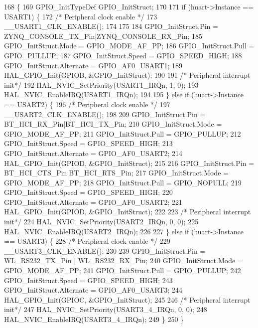 \begin{DoxyCode}
168 \{
169     GPIO\_InitTypeDef GPIO\_InitStruct;
170     
171     \textcolor{keywordflow}{if} (huart->Instance == USART1) \{
172         \textcolor{comment}{/* Peripheral clock enable */}
173         \_\_USART1\_CLK\_ENABLE();
174   
175   
184         GPIO\_InitStruct.Pin = ZYNQ\_CONSOLE\_TX\_Pin|ZYNQ\_CONSOLE\_RX\_Pin;
185         GPIO\_InitStruct.Mode = GPIO\_MODE\_AF\_PP;
186         GPIO\_InitStruct.Pull = GPIO\_PULLUP;
187         GPIO\_InitStruct.Speed = GPIO\_SPEED\_HIGH;
188         GPIO\_InitStruct.Alternate = GPIO\_AF0\_USART1;
189         HAL\_GPIO\_Init(GPIOB, &GPIO\_InitStruct);
190 
191         \textcolor{comment}{/* Peripheral interrupt init*/}
192         HAL\_NVIC\_SetPriority(USART1\_IRQn, 1, 0);
193         HAL\_NVIC\_EnableIRQ(USART1\_IRQn);
194         
195     \} \textcolor{keywordflow}{else} \textcolor{keywordflow}{if} (huart->Instance == USART2) \{
196         \textcolor{comment}{/* Peripheral clock enable */}
197         \_\_USART2\_CLK\_ENABLE();
198   
209         GPIO\_InitStruct.Pin = BT\_HCI\_RX\_Pin|BT\_HCI\_TX\_Pin;
210         GPIO\_InitStruct.Mode = GPIO\_MODE\_AF\_PP;
211         GPIO\_InitStruct.Pull = GPIO\_PULLUP;
212         GPIO\_InitStruct.Speed = GPIO\_SPEED\_HIGH;
213         GPIO\_InitStruct.Alternate = GPIO\_AF0\_USART2;
214         HAL\_GPIO\_Init(GPIOD, &GPIO\_InitStruct);
215 
216         GPIO\_InitStruct.Pin = BT\_HCI\_CTS\_Pin|BT\_HCI\_RTS\_Pin;
217         GPIO\_InitStruct.Mode = GPIO\_MODE\_AF\_PP;
218         GPIO\_InitStruct.Pull = GPIO\_NOPULL;
219         GPIO\_InitStruct.Speed = GPIO\_SPEED\_HIGH;
220         GPIO\_InitStruct.Alternate = GPIO\_AF0\_USART2;
221         HAL\_GPIO\_Init(GPIOD, &GPIO\_InitStruct);
222 
223         \textcolor{comment}{/* Peripheral interrupt init*/}
224         HAL\_NVIC\_SetPriority(USART2\_IRQn, 0, 0);
225         HAL\_NVIC\_EnableIRQ(USART2\_IRQn);
226 
227     \} \textcolor{keywordflow}{else} \textcolor{keywordflow}{if} (huart->Instance == USART3) \{
228         \textcolor{comment}{/* Peripheral clock enable */}
229         \_\_USART3\_CLK\_ENABLE();
230   
239         GPIO\_InitStruct.Pin =  WL\_RS232\_TX\_Pin |  WL\_RS232\_RX\_Pin;
240         GPIO\_InitStruct.Mode = GPIO\_MODE\_AF\_PP;
241         GPIO\_InitStruct.Pull = GPIO\_PULLUP;
242         GPIO\_InitStruct.Speed = GPIO\_SPEED\_HIGH;
243         GPIO\_InitStruct.Alternate = GPIO\_AF0\_USART3;
244         HAL\_GPIO\_Init(GPIOC, &GPIO\_InitStruct);
245 
246         \textcolor{comment}{/* Peripheral interrupt init*/}
247         HAL\_NVIC\_SetPriority(USART3\_4\_IRQn, 0, 0);
248         HAL\_NVIC\_EnableIRQ(USART3\_4\_IRQn);
249     \}
250 \}
\end{DoxyCode}
\mbox{\label{group___s_d___u_a_r_t___functions_ga1464d7463564d0d7341a1cff71eb439d}} 
